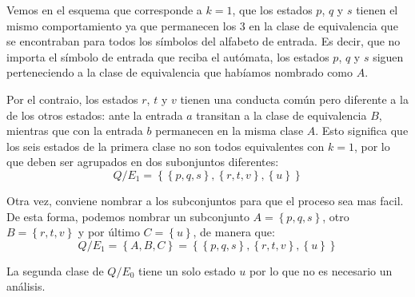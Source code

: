 \documentclass[12pt]{article}
\begin{document}
\begin{center}
\end{center}

Vemos en el esquema que corresponde a $ k=1 $, que los estados $ p $, $ q $ y $ s $ tienen el mismo comportamiento ya que permanecen los 3 en la clase de equivalencia que se encontraban para todos los símbolos del alfabeto de entrada. Es decir, que no importa el símbolo de entrada que reciba el autómata, los estados $ p $, $ q $ y $ s $ siguen perteneciendo a la clase de equivalencia que habíamos nombrado como $ A $.

Por el contraio, los estados $ r $, $ t $ y $ v $ tienen una conducta común pero diferente a la de los otros estados: ante la entrada $ a $ transitan a la clase de equivalencia $ B $, mientras que con la entrada $ b $ permanecen en la misma clase $ A $. Esto significa que los seis estados de la primera clase no son todos equivalentes con $ k=1 $, por lo que deben ser agrupados en dos subonjuntos diferentes:
\[
Q/E_{1}=\left\{\left\{p,q,s\right\},\left\{r,t,v\right\},\left\{u\right\}\right\}
\]

Otra vez, conviene nombrar a los subconjuntos para que el proceso sea mas facil. De esta forma, podemos nombrar un subconjunto $ A = \left\{p,q,s\right\} $, otro $ B = \left\{r,t,v\right\} $ y por último $ C = \left\{u\right\} $, de manera que:
\[
Q/E_{1} = \left\{A,B,C\right\} = \left\{\left\{p,q,s\right\},\left\{r,t,v\right\},\left\{u\right\}\right\}
\]

La segunda clase de $ Q/E_{0} $ tiene un solo estado $ u $ por lo que no es necesario un análisis.
\end{document}

